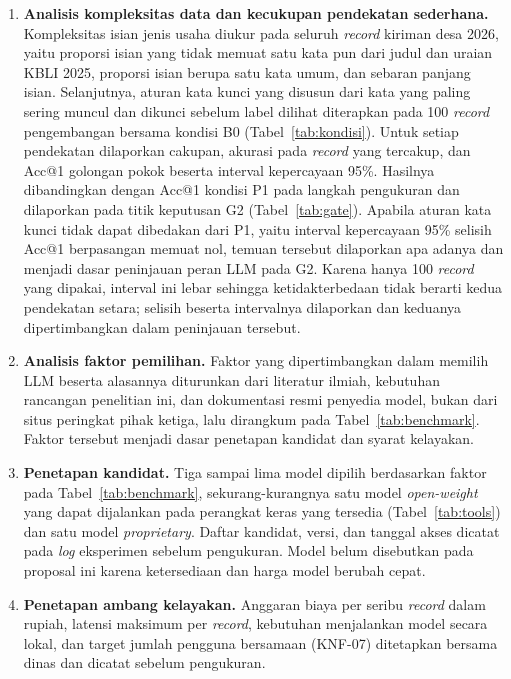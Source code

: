 \begin{enumerate}
  \item \textbf{Analisis kompleksitas data dan kecukupan pendekatan sederhana.} Kompleksitas isian jenis usaha diukur pada seluruh \textit{record} kiriman desa 2026, yaitu proporsi isian yang tidak memuat satu kata pun dari judul dan uraian KBLI 2025, proporsi isian berupa satu kata umum, dan sebaran panjang isian. Selanjutnya, aturan kata kunci yang disusun dari kata yang paling sering muncul dan dikunci sebelum label dilihat diterapkan pada 100 \textit{record} pengembangan bersama kondisi B0 (Tabel~\ref{tab:kondisi}). Untuk setiap pendekatan dilaporkan cakupan, akurasi pada \textit{record} yang tercakup, dan Acc@1 golongan pokok beserta interval kepercayaan 95\%. Hasilnya dibandingkan dengan Acc@1 kondisi P1 pada langkah pengukuran dan dilaporkan pada titik keputusan G2 (Tabel~\ref{tab:gate}). Apabila aturan kata kunci tidak dapat dibedakan dari P1, yaitu interval kepercayaan 95\% selisih Acc@1 berpasangan memuat nol, temuan tersebut dilaporkan apa adanya dan menjadi dasar peninjauan peran LLM pada G2. Karena hanya 100 \textit{record} yang dipakai, interval ini lebar sehingga ketidakterbedaan tidak berarti kedua pendekatan setara; selisih beserta intervalnya dilaporkan dan keduanya dipertimbangkan dalam peninjauan tersebut.
  \item \textbf{Analisis faktor pemilihan.} Faktor yang dipertimbangkan dalam memilih LLM beserta alasannya diturunkan dari literatur ilmiah, kebutuhan rancangan penelitian ini, dan dokumentasi resmi penyedia model, bukan dari situs peringkat pihak ketiga, lalu dirangkum pada Tabel~\ref{tab:benchmark}. Faktor tersebut menjadi dasar penetapan kandidat dan syarat kelayakan.
  \item \textbf{Penetapan kandidat.} Tiga sampai lima model dipilih berdasarkan faktor pada Tabel~\ref{tab:benchmark}, sekurang-kurangnya satu model \textit{open-weight} yang dapat dijalankan pada perangkat keras yang tersedia (Tabel~\ref{tab:tools}) dan satu model \textit{proprietary}. Daftar kandidat, versi, dan tanggal akses dicatat pada \textit{log} eksperimen sebelum pengukuran. Model belum disebutkan pada proposal ini karena ketersediaan dan harga model berubah cepat.
  \item \textbf{Penetapan ambang kelayakan.} Anggaran biaya per seribu \textit{record} dalam rupiah, latensi maksimum per \textit{record}, kebutuhan menjalankan model secara lokal, dan target jumlah pengguna bersamaan (KNF-07) ditetapkan bersama dinas dan dicatat sebelum pengukuran.

\end{enumerate}
